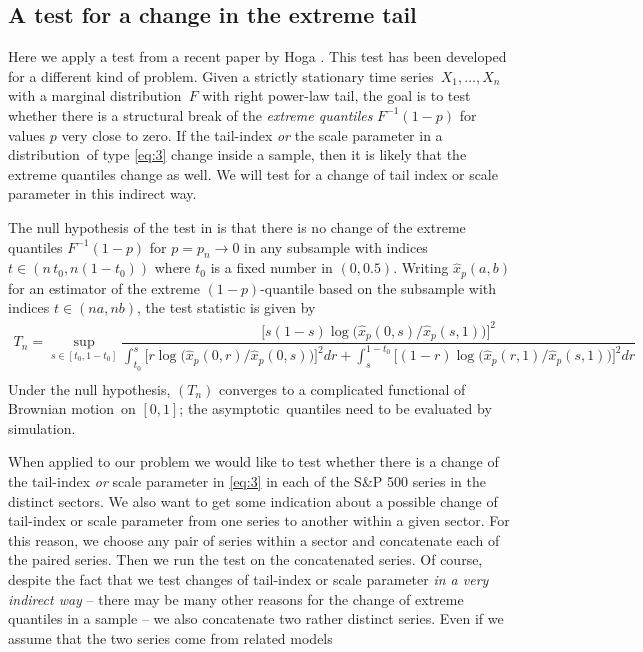 \documentclass[11pt,a4]{amsart}
\newcommand{\asy}{asymptotic}
\newcommand{\ts}{time series}
\newcommand{\beam}{\begin{eqnarray}}
\newcommand{\eeam}{\end{eqnarray}\noindent}
\newcommand{\BM}{Brownian motion}
\newcommand{\fct}{function}
\newcommand{\ds}{distribution}
\newcommand{\1}{{\mathbf 1}}
\begin{document}
\subsection{A test for a change in the extreme tail}\label{sec:Hoga}
Here we apply a test from
a recent paper by Hoga \cite{hoga:2016}. This test has been developed
for a different kind of problem. Given a strictly stationary
\ts\ $X_1,\ldots,X_n$ with a marginal \ds\ $F$ with right power-law
tail, the goal is to test whether there is a structural break of the
{\em extreme quantiles} $F^{-1}(1-p)$ for values $p$ very close to
zero. If the tail-index {\em or} the scale parameter in a \ds\ of type
\eqref{eq:3} change inside a sample, then it is likely that the
extreme quantiles change as well. We will test for a change of tail
index or scale parameter in this indirect way.
\par
The null hypothesis of the test in \cite{hoga:2016} is that there is no change of the extreme quantiles $F^{-1}(1-p)$ 
for $p=p_n\to 0$ in any subsample with indices
$t\in (n\,t_0,n(1-t_0))$ where $t_0$ is a fixed number in $(0,0.5)$. Writing $\hat x_p(a,b)$ for an estimator of the extreme $(1-p)$-quantile 
based on the subsample with indices $t\in (na,nb)$, the test statistic is given by
\beam\label{eq:4}
T_n = \sup_{s \in [t_0, 1 - t_0]}
  \dfrac{  \big[s (1 - s) \log \big(\hat x_p(0, s)/\hat x_p(s, 1)\big)
    \big]^2}{
    \int_{t_0}^s\big[r \log \big( \hat x_p(0, r)/\hat x_p(0, s)
      \big)
    \big]^2 dr
    +
    \int_{s}^{1 - t_0}
    \big[
      (1 - r) \log \big(
      \hat x_p(r, 1)/
      \hat x_p(s, 1)
      \big)
    \big]^2 dr}\nonumber\\
\eeam
Under the null hypothesis, $(T_n)$ converges to a complicated \fct al of \BM\ on $[0,1]$; the \asy\ quantiles need to be 
evaluated by simulation.  
\par
When applied to our problem we would like to test 
whether there is a change of the tail-index {\em or} scale parameter in \eqref{eq:3} in each of the S\&P 500 
series in the distinct sectors. We also  want to get some indication about a possible change of tail-index or
scale parameter from one series to another within a given sector. For this reason, we choose any pair of series
within a sector and concatenate each of the paired series. Then we run the test on the concatenated series.
Of course, despite the fact that we test changes of tail-index or scale parameter 
{\em in a very indirect way} -- there may be many other reasons for the change of extreme quantiles in a sample -- 
we also concatenate two rather distinct series. Even if we assume that the two series come from related models
\end{document}
